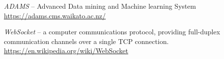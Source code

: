 %

\begin{thebibliography}{999}

		\textit{ADAMS} -- Advanced Data mining and Machine learning System \\
		\url{https://adams.cms.waikato.ac.nz/}{}

		\textit{WebSocket} -- a computer communications protocol, providing
		full-duplex communication channels over a single TCP connection. \\
		\url{https://en.wikipedia.org/wiki/WebSocket}{}

\end{thebibliography}
